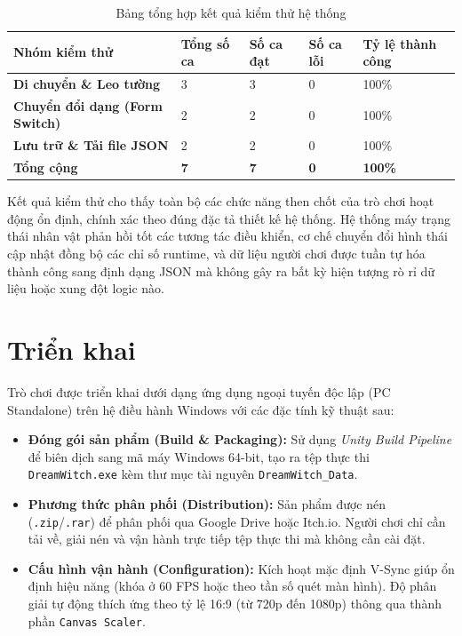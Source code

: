 \documentclass[../DoAn.tex]{subfiles}
\begin{document}
\begin{table}[H]
\centering
\begin{tabular}{|p{3.5cm}|p{1.8cm}|p{1.8cm}|p{1.8cm}|p{2.6cm}|}
\hline
\textbf{Nhóm kiểm thử} & \textbf{Tổng số ca} & \textbf{Số ca đạt} & \textbf{Số ca lỗi} & \textbf{Tỷ lệ thành công} \\ \hline
\textbf{Di chuyển \& Leo tường} & 3 & 3 & 0 & 100\% \\ \hline
\textbf{Chuyển đổi dạng (Form Switch)} & 2 & 2 & 0 & 100\% \\ \hline
\textbf{Lưu trữ \& Tải file JSON} & 2 & 2 & 0 & 100\% \\ \hline
\textbf{Tổng cộng} & \textbf{7} & \textbf{7} & \textbf{0} & \textbf{100\%} \\ \hline
\end{tabular}
\caption{Bảng tổng hợp kết quả kiểm thử hệ thống}
\label{table:test_results}
\end{table}

Kết quả kiểm thử cho thấy toàn bộ các chức năng then chốt của trò chơi hoạt động ổn định, chính xác theo đúng đặc tả thiết kế hệ thống. Hệ thống máy trạng thái nhân vật phản hồi tốt các tương tác điều khiển, cơ chế chuyển đổi hình thái cập nhật đồng bộ các chỉ số runtime, và dữ liệu người chơi được tuần tự hóa thành công sang định dạng JSON mà không gây ra bất kỳ hiện tượng rò rỉ dữ liệu hoặc xung đột logic nào.


\section{Triển khai}
\label{section:5.7}
Trò chơi được triển khai dưới dạng ứng dụng ngoại tuyến độc lập (PC Standalone) trên hệ điều hành Windows với các đặc tính kỹ thuật sau:

\begin{itemize}
    \item \textbf{Đóng gói sản phẩm (Build \& Packaging):} Sử dụng \textit{Unity Build Pipeline} để biên dịch sang mã máy Windows 64-bit, tạo ra tệp thực thi \texttt{DreamWitch.exe} kèm thư mục tài nguyên \texttt{DreamWitch\_Data}.
    \item \textbf{Phương thức phân phối (Distribution):} Sản phẩm được nén (\texttt{.zip}/\texttt{.rar}) để phân phối qua Google Drive hoặc Itch.io. Người chơi chỉ cần tải về, giải nén và vận hành trực tiếp tệp thực thi mà không cần cài đặt.
    \item \textbf{Cấu hình vận hành (Configuration):} Kích hoạt mặc định V-Sync giúp ổn định hiệu năng (khóa ở 60 FPS hoặc theo tần số quét màn hình). Độ phân giải tự động thích ứng theo tỷ lệ 16:9 (từ 720p đến 1080p) thông qua thành phần \texttt{Canvas Scaler}.
\end{itemize}
\end{document}
